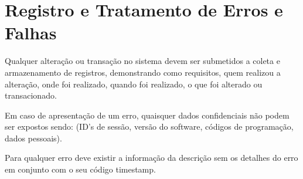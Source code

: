 \section{Registro e Tratamento de Erros e Falhas}

Qualquer alteração ou transação no sistema devem ser submetidos a coleta e armazenamento de registros, demonstrando como requisitos, quem realizou a alteração, onde foi realizado, quando foi realizado, o que foi alterado ou transacionado.

Em caso de apresentação de um erro, quaisquer dados confidenciais não podem ser expostos sendo: (ID’s de sessão, versão do software, códigos de programação, dados pessoais).

Para qualquer erro deve existir a informação da descrição sem os detalhes do erro em conjunto com o seu código \gls{timestamp}.

